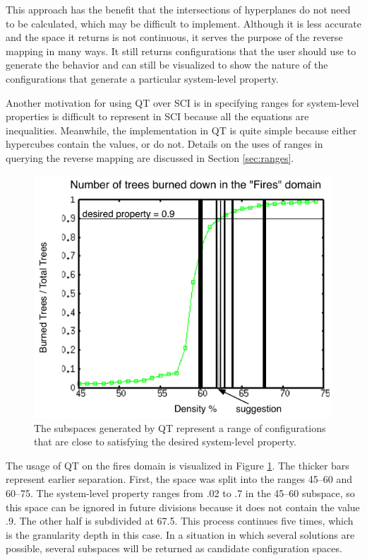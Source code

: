 This approach has the benefit that the intersections of hyperplanes do not need to be calculated, which may be difficult to implement.
Although it is less accurate and the space it returns is not continuous, it serves the purpose of the reverse mapping in many ways.
It still returns configurations that the user should use to generate the behavior and can still be visualized to show the nature of the configurations that generate a particular system-level property.

Another motivation for using QT over SCI is in specifying ranges for system-level properties is difficult to represent in SCI because all the equations are inequalities.
Meanwhile, the implementation in QT is quite simple because either hypercubes contain the values, or do not.
Details on the uses of ranges in querying the reverse mapping are discussed in Section \ref{sec:ranges}.

\begin{figure}[ht]
\centering
\includegraphics[scale=1]{images/QTfires.pdf}
\caption{The subspaces generated by QT represent a range of configurations that are close to satisfying the desired system-level property.}
\label{fig:qtfires}
\end{figure}

The usage of QT on the fires domain is visualized in Figure \ref{fig:qtfires}.
The thicker bars represent earlier separation.
First, the space was split into the ranges 45--60 and 60--75.
The system-level property ranges from .02 to .7 in the 45--60 subspace, so this space can be ignored in future divisions because it does not contain the value .9.
The other half is subdivided at 67.5.
This process continues five times, which is the granularity depth in this case.
In a situation in which several solutions are possible, several subspaces will be returned as candidate configuration spaces.

